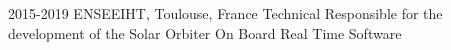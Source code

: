 
\begin{cventries}

\cventry
{2015-2019}
{ENSEEIHT, Toulouse, France}
{Technical Responsible for the development of the Solar Orbiter On Board Real Time Software}

\end{cventries}
